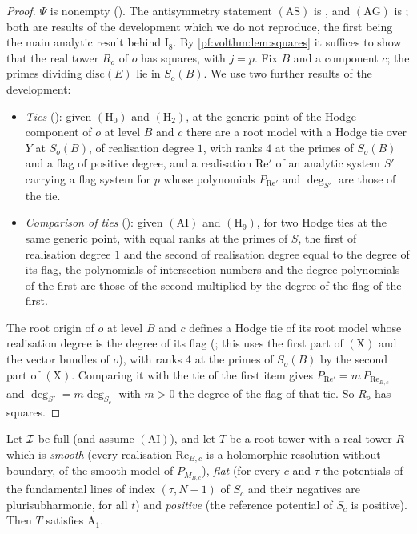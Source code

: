 \begin{proof}
$\Psi$ is nonempty (). The antisymmetry
statement $(\mathrm{AS})$ is , and $(\mathrm{AG})$ is
; both are results of the development which we do not reproduce, the first
being the main analytic result behind $\mathrm{I}_8$. By \cref{pf:volthm:lem:squares} it suffices to show that the real
tower $R_o$ of $o$ has squares, with $j=p$. Fix $B$ and a component $c$; the primes dividing $\mathrm{disc}(E)$ lie in
$S_o(B)$. We use two further results of the development:
\begin{itemize}
\item \emph{Ties} (): given $(\mathrm{H}_0)$ and $(\mathrm{H}_2)$, at the generic point of the
Hodge component of $o$ at level $B$ and $c$ there are a root model with a Hodge tie over $Y$ at $S_o(B)$, of realisation
degree $1$, with ranks $4$ at the primes of $S_o(B)$ and a flag of positive degree, and a realisation $\mathrm{Re}'$ of an
analytic system $S'$ carrying a flag system for $p$ whose polynomials $P_{\mathrm{Re}'}$ and $\deg_{S'}$ are those of the tie.
\item \emph{Comparison of ties} (): given $(\mathrm{AI})$ and $(\mathrm{H}_9)$, for two Hodge
ties at the same generic point, with equal ranks at the primes of $S$, the first of realisation degree $1$ and the
second of realisation degree equal to the degree of its flag, the polynomials of intersection numbers and the degree
polynomials of the first are those of the second multiplied by the degree of the flag of the first.
\end{itemize}
The root origin of $o$ at level $B$ and $c$ defines a Hodge tie of its root model whose realisation degree is the degree
of its flag (; this uses the first part of $(\mathrm{X})$ and the
vector bundles of $o$), with ranks $4$ at the primes of $S_o(B)$ by the second part of $(\mathrm{X})$. Comparing it with the
tie of the first item gives $P_{\mathrm{Re}'}=m\,P_{\mathrm{Re}_{B,c}}$ and $\deg_{S'}=m\deg_{S_c}$ with $m>0$ the degree of the
flag of that tie. So $R_o$ has squares.
\end{proof}

\begin{proposition}\label{pf:volthm:prop:A1}
Let $\mathcal{I}$ be full (and assume $(\mathrm{AI})$), and let $T$ be a root tower with a real tower $R$ which is
\emph{smooth} (every realisation $\mathrm{Re}_{B,c}$ is a holomorphic resolution without boundary, of the smooth model of
$P_{M_{B,c}}$), \emph{flat} (for every $c$ and $\tau$ the potentials of the fundamental lines of index $(\tau,N-1)$ of $S_c$
and their negatives are plurisubharmonic, for all $t$) and \emph{positive} (the reference potential of $S_c$ is
positive). Then $T$ satisfies $\mathrm{A}_1$.
\end{proposition}

